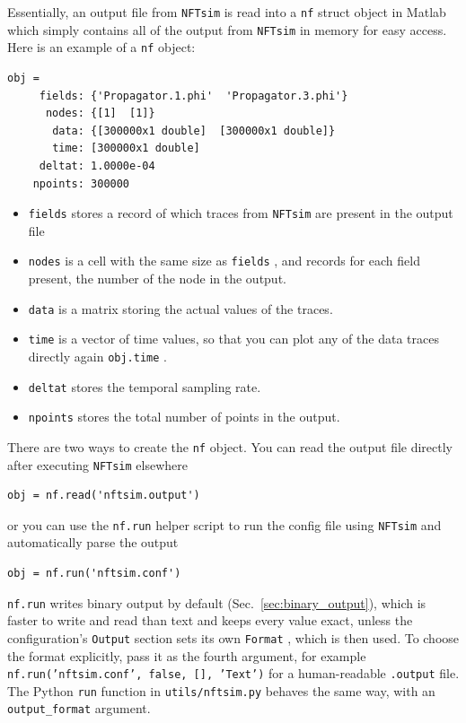\documentclass[12pt,a4paper]{article}
\newcommand{\type}[1]{{\small\small\tt #1} }
\newcommand{\NF}[0]{\type{NFTsim}}
\begin{document}
Essentially, an output file from \NF is read into a \type{nf} struct object in Matlab which simply contains all of the output from \NF in memory for easy access. Here is an example of a \type{nf} object:
\begin{lstlisting}
obj =
     fields: {'Propagator.1.phi'  'Propagator.3.phi'}
      nodes: {[1]  [1]}
       data: {[300000x1 double]  [300000x1 double]}
       time: [300000x1 double]
     deltat: 1.0000e-04
    npoints: 300000
\end{lstlisting}
\begin{itemize}
\item \type{fields} stores a record of which traces from \NF are present in the output file
\item \type{nodes} is a cell with the same size as \type{fields}, and records for each field present, the number of the node in the output.
\item \type{data} is a matrix storing the actual values of the traces.
\item \type{time} is a vector of time values, so that you can plot any of the data traces directly again \type{obj.time}.
\item \type{deltat} stores the temporal sampling rate.
\item \type{npoints} stores the total number of points in the output.
\end{itemize}

There are two ways to create the \type{nf} object. You can read the output file directly after executing \NF elsewhere

\begin{lstlisting}
obj = nf.read('nftsim.output')
\end{lstlisting}

or you can use the \type{nf.run} helper script to run the config file using \NF and automatically parse the output

\begin{lstlisting}
obj = nf.run('nftsim.conf')
\end{lstlisting}

\type{nf.run} writes binary output by default (Sec.~\ref{sec:binary_output}), which is faster to write and read than text and keeps every value exact, unless the configuration's \type{Output} section sets its own \type{Format}, which is then used.
To choose the format explicitly, pass it as the fourth argument, for example \type{nf.run('nftsim.conf', false, [], 'Text')} for a human-readable \type{.output} file.
The Python \type{run} function in \type{utils/nftsim.py} behaves the same way, with an \type{output\_format} argument.
\end{document}
